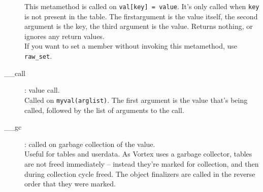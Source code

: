 \documentclass{article}
\begin{document}
\begin{description}
This metamethod is called on \verb|val[key] = value|. It's only called
when \verb|key| is not present in the table. The firstargument is the value
itself, the second argument is the key, the third argument is the value.
Returns nothing, or ignores any return values.\\
If you want to set a member without invoking this metamethod, use
\verb|raw_set|.
\item[__call]: value call. \hfill \\
Called on \verb|myval(arglist)|. The first argument is the value that's being
called, followed by the list of arguments to the call.
\item[__gc]: called on garbage collection of the value. \hfill \\
Useful for tables and userdata. As Vortex uses a garbage collector, tables
are not freed immediately -- instead they're marked for collection, and then
during collection cycle freed. The object finalizers are called in the reverse
order that they were marked.
\end{description}
\end{document}
